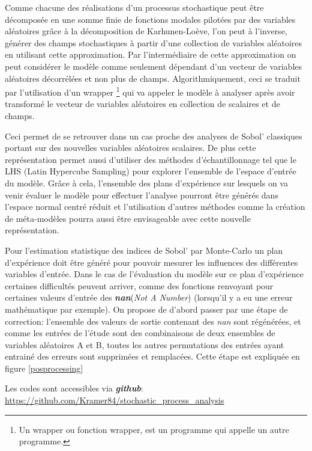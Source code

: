 \documentclass[a4paper,10pt]{article}
\begin{document}
Comme chacune des réalisations d'un processus stochastique peut être décomposée en une somme finie de fonctions modales pilotées par des variables aléatoires grâce à la décomposition de Karhunen-Loève, l'on peut à l'inverse, générer des champs stochastiques à partir d'une collection de variables aléatoires en utilisant cette approximation. Par l'intermédiaire de cette approximation on peut considérer le modèle comme seulement dépendant d'un vecteur de variables aléatoires décorrélées et non plus de champs. Algorithmiquement, ceci se traduit par l'utilisation d'un wrapper \footnote{Un wrapper ou fonction wrapper, est un programme qui appelle un autre programme. } qui va appeler le modèle à analyser après avoir transformé le vecteur de variables aléatoires en collection de scalaires et de champs. \smallskip

Ceci permet de se retrouver dans un cas proche des analyses de Sobol' classiques portant sur des nouvelles variables aléatoires scalaires. De plus cette représentation permet aussi d'utiliser des méthodes d’échantillonnage tel que le LHS (Latin Hypercube Sampling) pour explorer l'ensemble de l'espace d'entrée du modèle. Grâce à cela, l'ensemble des plans d’expérience sur lesquels on va venir évaluer le modèle pour effectuer l'analyse pourront être générés dans l'espace normal centré réduit et l'utilisation d'autres méthodes comme la création de méta-modèles pourra aussi être envisageable avec cette nouvelle représentation. \par \bigskip

Pour l'estimation statistique des indices de Sobol' par Monte-Carlo un plan d’expérience doit être généré pour pouvoir mesurer les influences des différentes variables d'entrée. 
Dans le cas de l'évaluation du modèle sur ce plan d’expérience certaines difficultés peuvent arriver, comme des fonctions renvoyant pour certaines valeurs d'entrée des \textbf{\textit{nan}}(\textit{Not A Number}) (lorsqu'il y a eu une erreur mathématique par exemple). On propose de d'abord passer par une étape de correction: l'ensemble des valeurs de sortie contenant des \textit{nan} sont régénérées, et comme les entrées de l'étude sont des combinaisons de deux ensembles de variables aléatoires A et B, toutes les autres permutations des entrées ayant entrainé des erreurs sont supprimées et remplacées. Cette étape est expliquée en figure \ref{posprocessing} \

Les codes sont accessibles via \textit{\textbf{github}}: \\
\url{https://github.com/Kramer84/stochastic_process_analysis}
\end{document}
